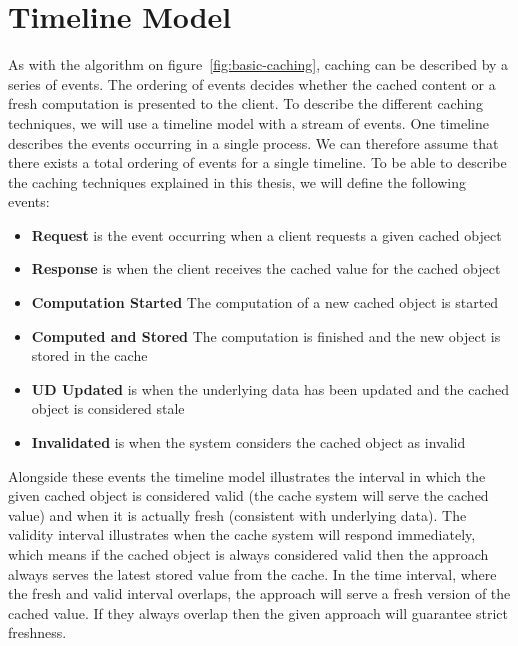 
\section{Timeline Model}
\label{sec:timeline-model}

As with the algorithm on figure~\ref{fig:basic-caching}, caching can be described by a series of events. The ordering of events decides whether the cached content or a fresh computation is presented to the client. To describe the different caching techniques, we will use a timeline model with a stream of events. One timeline describes the events occurring in a single process. We can therefore assume that there exists a total ordering of events for a single timeline. To be able to describe the caching techniques explained in this thesis, we will define the following events:

\begin{itemize}
  \item \textbf{Request} is the event occurring when a client requests a given cached object
  \item \textbf{Response} is when the client receives the cached value for the cached object
  \item \textbf{Computation Started} The computation of a new cached object is started
  \item \textbf{Computed and Stored} The computation is finished and the new object is stored in the cache
  \item \textbf{UD Updated} is when the underlying data has been updated and the cached object is considered stale
  \item \textbf{Invalidated} is when the system considers the cached object as invalid
\end{itemize}

Alongside these events the timeline model illustrates the interval in which the given cached object is considered valid (the cache system will serve the cached value) and when it is actually fresh (consistent with underlying data). The validity interval illustrates when the cache system will respond immediately, which means if the cached object is always considered valid then the approach always serves the latest stored value from the cache. In the time interval, where the fresh and valid interval overlaps, the approach will serve a fresh version of the cached value. If they always overlap then the given approach will guarantee strict freshness.

